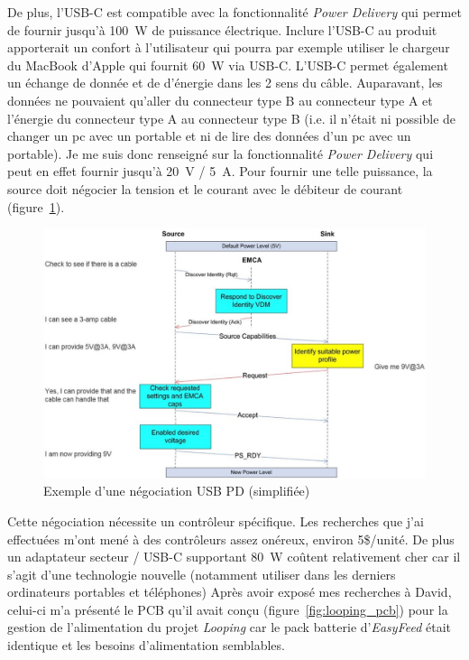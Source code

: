 \documentclass[a4paper, 12pt, sffamily]{report}
\begin{document}
De plus, l’USB-C est compatible avec la fonctionnalité \emph{Power Delivery} qui permet de fournir jusqu’à \SI{100}{\watt} de puissance électrique. Inclure l’USB-C au produit apporterait un confort à l’utilisateur qui pourra par exemple utiliser le chargeur du MacBook d’Apple qui fournit \SI{60}{\watt} via USB-C.
L'USB-C permet également un échange de donnée et de d'énergie dans les 2 sens du câble. Auparavant, les données ne pouvaient qu'aller du connecteur type B au connecteur type A et l'énergie du connecteur type A au connecteur type B (i.e. il n'était ni possible de changer un pc avec un portable et ni de lire des données d'un pc avec un portable).
Je me suis donc renseigné sur la fonctionnalité \emph{Power Delivery} qui peut en effet fournir jusqu’à \SI{20}{\volt} / \SI{5}{\ampere}. Pour fournir une telle puissance, la source doit négocier la tension et le courant avec le débiteur de courant (figure~\ref{fig:usb_pd_negociation}).

\begin{figure}[H]
\centering
\includegraphics[scale=0.35]{figures/screenshots/usb_pd_nego.png}
\caption{Exemple d’une négociation USB PD (simplifiée) \cite{usb_pd_nego}}
\label{fig:usb_pd_negociation}
\end{figure}

Cette négociation nécessite un contrôleur spécifique. Les recherches que j’ai effectuées m’ont mené à des contrôleurs assez onéreux, environ 5\$/unité. De plus un adaptateur secteur / USB-C supportant \SI{80}{\watt} coûtent relativement cher car il s'agit d'une technologie nouvelle (notamment utiliser dans les derniers ordinateurs portables et téléphones)
Après avoir exposé mes recherches à David, celui-ci m'a présenté le PCB qu’il avait conçu (figure~\ref{fig:looping_pcb}) pour la gestion de l’alimentation du projet \emph{Looping} car le pack batterie d'\emph{EasyFeed} était identique et les besoins d'alimentation semblables.
\end{document}
